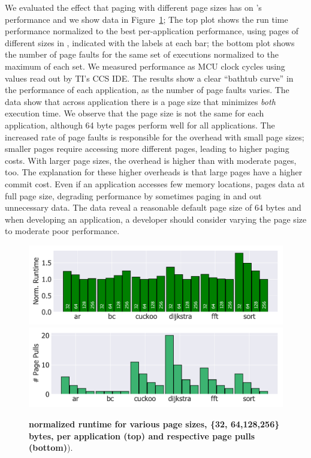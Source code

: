 We evaluated the effect that paging with different page sizes has on \sys's performance and we show data in Figure~\ref{fig:page_size}; The top plot shows the run time performance normalized to the best per-application performance, using pages of different sizes in \sys, indicated with the labels at each bar; the bottom plot shows the number of page faults for the same set of executions normalized to the maximum of each set. We measured performance as MCU clock cycles using values read out by TI's CCS IDE. The results show a clear ``bathtub curve'' in the performance of each application, as the number of page faults varies. The data show that across application there is a page size that minimizes \emph{both} execution time. We observe that the page size is not the same for each application, although 64 byte pages perform well for all applications. The increased rate of page faults is responsible for the overhead with small page sizes; smaller pages require accessing more different pages, leading to higher paging costs. With larger page sizes, the overhead is higher than with moderate pages, too. The explanation for these higher overheads is that large pages have a higher commit cost. Even if an application accesses few memory locations, \sys pages data at full page size, degrading performance by sometimes paging in and out unnecessary data. The data reveal a reasonable default page size of 64 bytes and when developing an application, a developer should consider varying the page size to moderate poor performance.

\begin{figure}
	\centering
	\includegraphics[width=\columnwidth]{figures/page_exec-time}
	\includegraphics[width=\columnwidth]{figures/pagePulls}
	\caption{\textbf{\sys normalized runtime for various page sizes, \{32, 64,128,256\}\,bytes, per application (top) and respective page pulls (bottom)}).}\vspace{-0.5cm}
	\label{fig:page_size}
\end{figure}

